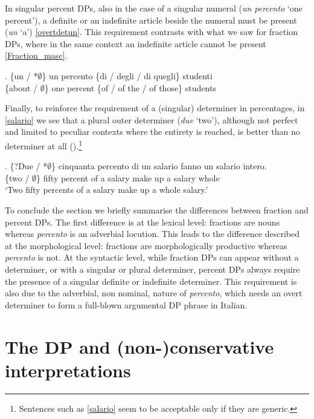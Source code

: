 \documentclass[charis, linguex]{glossa}
\begin{document}
In singular percent DPs, also in the case of a singular numeral (\textit{un percento} `one percent'), a definite or an indefinite article beside the numeral must be present (\textit{un} `a') \ref{overtdetun}. This requirement contrasts with what we saw for fraction DPs, where in the same context an indefinite article cannot be present \ref{Fraction_masc}. 

\ex.  \gll \{un / *$\emptyset$\} un percento \{di / degli / di quegli\} studenti \\
      \{about / $\emptyset$\}  one   percent  \{of / {of the} / of those\} students \\ \label{overtdetun}
	
Finally, to reinforce the requirement of a (singular) determiner in percentages, in \ref{salario} we see that a plural outer determiner (\textit{due} `two'), although not perfect and limited to peculiar contexts where the entirety is reached, is better than no determiner at all (\citealt[ex.66]{fal19}).\footnote{Sentences such as \ref{salario} seem to be acceptable only if they are generic.}
         
     
\exg.  \{?Due / *$\emptyset$\} cinquanta percento di un salario fanno un salario intero. \\
          \{two / $\emptyset$\} fifty percent  of a salary {make up} a salary whole\\
          \glt  `Two fifty percents of a salary make up a whole salary.' \label{salario}
  
	  
To conclude the section we briefly summarise the differences between fraction and percent DPs. The first difference is at the lexical level: fractions are nouns whereas \textit{percento} is an adverbial locution. This leads to the difference described at the morphological level: fractions are morphologically productive whereas \textit{percento} is not. At the syntactic level, while fraction DPs can appear without a determiner, or with a singular or plural determiner, percent DPs always require the presence of a singular definite or indefinite determiner. This requirement is also due to the adverbial, non nominal, nature of \textit{percento}, which needs an overt determiner to form a full-blown argumental DP phrase in Italian.  


\section{The DP and (non-)conservative interpretations} \label{Sec-DP}
\end{document}
